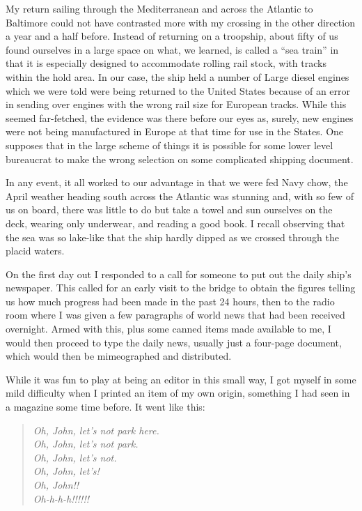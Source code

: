 \documentclass[../m3y]{subfiles}
\begin{document}
My return sailing through the Mediterranean and across the Atlantic to Baltimore could not have contrasted more with my crossing in the other direction a year and a half before. Instead of returning on a troopship, about fifty of us found ourselves in a large space on what, we learned, is called a ``sea train'' in that it is especially designed to accommodate rolling rail stock, with tracks within the hold area. In our case, the ship held a number of Large diesel engines which we were told were being returned to the United States because of an error in sending over engines with the wrong rail size for European tracks. While this seemed far-fetched, the evidence was there before our eyes as, surely, new engines were not being manufactured in Europe at that time for use in the States. One supposes that in the large scheme of things it is possible for some lower level bureaucrat to make the wrong selection on some complicated shipping document.

In any event, it all worked to our advantage in that we were fed Navy chow, the April weather heading south across the Atlantic was stunning and, with so few of us on board, there was little to do but take a towel and sun ourselves on the deck, wearing only underwear, and reading a good book. I recall observing that the sea was so lake-like that the ship hardly dipped as we crossed through the placid waters.

On the first day out I responded to a call for someone to put out the daily ship's newspaper. This called for an early visit to the bridge to obtain the figures telling us how much progress had been made in the past 24 hours, then to the radio room where I was given a few paragraphs of world news that had been received overnight. Armed with this, plus some canned items made available to me, I would then proceed to type the daily news, usually just a four-page document, which would then be mimeographed and distributed.

While it was fun to play at being an editor in this small way, I got myself in some mild difficulty when I printed an item of my own origin, something I had seen in a magazine some time before. It went like this:

\begin{quote}
\emph{Oh, John, let's not park here.\\
Oh, John, let's not park.\\
Oh, John, let's not.\\
Oh, John, let's!\\
Oh, John!!\\
Oh-h-h-h!!!!!!
}
\end{quote}
\end{document}

